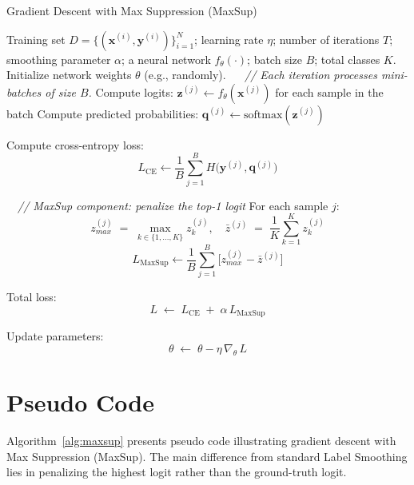 \begin{algorithm}[ht!]
\caption{Gradient Descent with Max Suppression (MaxSup)}
\label{alg:maxsup}
\scriptsize
\begin{algorithmic}[1]
\Require Training set $D = \{(\mathbf{x}^{(i)}, \mathbf{y}^{(i)})\}_{i=1}^{N}$; 
         learning rate $\eta$; 
         number of iterations $T$; 
         smoothing parameter $\alpha$; 
         a neural network $f_\theta(\cdot)$; 
         batch size $B$; 
         total classes $K$.
\State Initialize network weights $\theta$ (e.g., randomly).
    \Statex \(\quad\) \textit{// Each iteration processes mini-batches of size \(B\).}
        \State Compute logits: \(\mathbf{z}^{(j)} \gets f_\theta(\mathbf{x}^{(j)})\) for each sample in the batch
        \State Compute predicted probabilities: \(\mathbf{q}^{(j)} \gets \text{softmax}(\mathbf{z}^{(j)})\)

        \State Compute cross-entropy loss: 
        \[
        L_{\mathrm{CE}} \gets \frac{1}{B} \sum_{j=1}^{B} H\bigl(\mathbf{y}^{(j)}, \mathbf{q}^{(j)}\bigr)
        \]

        \State \(\quad\)\textit{// MaxSup component: penalize the top-1 logit}
        \State For each sample \(j\):
        \[
        z_{\textit{max}}^{(j)} \;=\; \max_{k \in \{1,\dots,K\}} z_k^{(j)}, 
        \quad
        \bar{z}^{(j)} \;=\; \frac{1}{K}\sum_{k=1}^{K} z_k^{(j)}
        \]
        \[
        L_{\mathrm{MaxSup}} \gets \frac{1}{B} \sum_{j=1}^{B} 
            \bigl[
                z_{\textit{max}}^{(j)} - \bar{z}^{(j)}
            \bigr]
        \]

        \State Total loss: 
        \[
        L \;\gets\; L_{\mathrm{CE}} \;+\; \alpha \, L_{\mathrm{MaxSup}}
        \]

        \State Update parameters:
        \[
        \theta \;\gets\; \theta - \eta\,\nabla_{\theta}\, L
        \]

    \EndFor
\EndFor
\end{algorithmic}
\end{algorithm}

\section{Pseudo Code}
\label{app:pseudo}
Algorithm~\ref{alg:maxsup} presents pseudo code illustrating gradient descent with Max Suppression (MaxSup). 
The main difference from standard Label Smoothing lies in penalizing the highest logit rather than the ground-truth logit.




